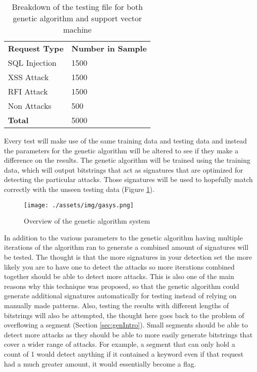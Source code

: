 \begin{table}
	\centering
	\label{tab:testfile}
	\begin{tabular}{|p{1.5in}|p{1.5in}|}
	\hline
		\textbf{Request Type} & \textbf{Number in Sample}\\
	\hhline{|=|=|}
		SQL Injection & 1500 \\
	\hline
		XSS Attack & 1500 \\
	\hline
		RFI Attack & 1500 \\
	\hline
		Non Attacks & 500 \\
	\hhline{|=|=|}
		\textbf{Total} & 5000 \\
	\hline
	\end{tabular}
	\caption{Breakdown of the testing file for both genetic algorithm and support vector machine}
\end{table}	

Every test will make use of the same training data and testing data and instead the parameters for the genetic algorithm will be altered to see if they make a difference on the results.  The genetic algorithm will be trained using the training data, which will output bitstrings that act as signatures that are optimized for detecting the particular attacks. Those signatures will be used to hopefully match correctly with the unseen testing data (Figure \ref{fig:gasys}).

\begin{figure}
	\label{fig:gasys}
	\texttt{[image: ./assets/img/gasys.png]}
	\caption{Overview of the genetic algorithm system}
\end{figure}

In addition to the various parameters to the genetic algorithm having multiple iterations of the algorithm ran to generate a combined amount of signatures will be tested.  The thought is that the more signatures in your detection set the more likely you are to have one to detect the attacks so more iterations combined together should be able to detect more attacks.  This is also one of the main reasons why this technique was proposed, so that the genetic algorithm could generate additional signatures automatically for testing instead of relying on manually made patterns.  Also, testing the results with different lengths of bitstrings will also be attempted, the thought here goes back to the problem of overflowing a segment (Section \ref{sec:genIntro}).  Small segments should be able to detect more attacks as they should be able to more easily generate bitstrings that cover a wider range of attacks.  For example, a segment that can only hold a count of 1 would detect anything if it contained a keyword even if that request had a much greater amount, it would essentially become a flag.


